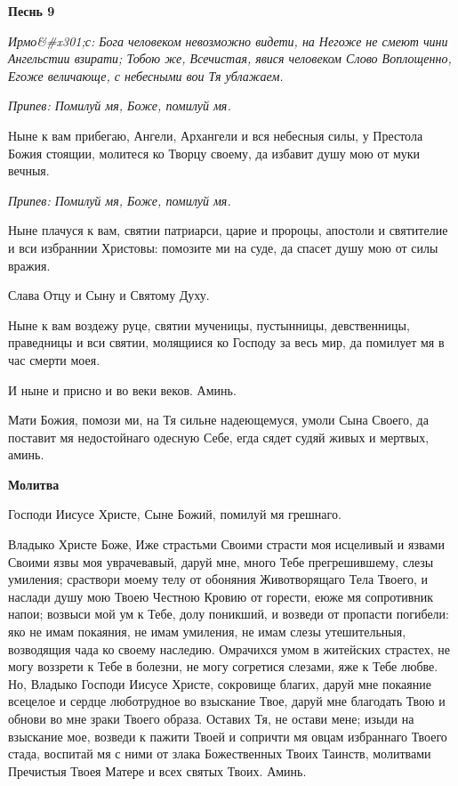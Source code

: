 \bfseries Песнь 9\normalfont{}


\itshape Ирмо&#x301;с:\normalfont{} Бога человеком невозможно видети, на Негоже не смеют чини Ангельстии взирати; Тобою же, Всечистая, явися человеком Слово Воплощенно, Егоже величающе, с небесными вои Тя ублажаем.


\itshape Припев:\normalfont{} Помилуй мя, Боже, помилуй мя.


Ныне к вам прибегаю, Ангели, Архангели и вся небесныя силы, у Престола Божия стоящии, молитеся ко Творцу своему, да избавит душу мою от муки вечныя.


\itshape Припев:\normalfont{} Помилуй мя, Боже, помилуй мя.


Ныне плачуся к вам, святии патриарси, царие и пророцы, апостоли и святителие и вси избраннии Христовы: помозите ми на суде, да спасет душу мою от силы вражия.


Слава Отцу и Сыну и Святому Духу.


Ныне к вам воздежу руце, святии мученицы, пустынницы, девственницы, праведницы и вси святии, молящиися ко Господу за весь мир, да помилует мя в час смерти моея.


И ныне и присно и во веки веков. Аминь.


Мати Божия, помози ми, на Тя сильне надеющемуся, умоли Сына Своего, да поставит мя недостойнаго одесную Себе, егда сядет судяй живых и мертвых, аминь.




\bfseries Молитва\normalfont{}


Господи Иисусе Христе, Сыне Божий, помилуй мя грешнаго.


Владыко Христе Боже, Иже страстьми Своими страсти моя исцеливый и язвами Своими язвы моя уврачевавый, даруй мне, много Тебе прегрешившему, слезы умиления; сраствори моему телу от обоняния Животворящаго Тела Твоего, и наслади душу мою Твоею Честною Кровию от горести, еюже мя сопротивник напои; возвыси мой ум к Тебе, долу поникший, и возведи от пропасти погибели: яко не имам покаяния, не имам умиления, не имам слезы утешительныя, возводящия чада ко своему наследию. Омрачихся умом в житейских страстех, не могу воззрети к Тебе в болезни, не могу согретися слезами, яже к Тебе любве. Но, Владыко Господи Иисусе Христе, сокровище благих, даруй мне покаяние всецелое и сердце люботрудное во взыскание Твое, даруй мне благодать Твою и обнови во мне зраки Твоего образа. Оставих Тя, не остави мене; изыди на взыскание мое, возведи к пажити Твоей и сопричти мя овцам избраннаго Твоего стада, воспитай мя с ними от злака Божественных Твоих Таинств, молитвами Пречистыя Твоея Матере и всех святых Твоих. Аминь.



